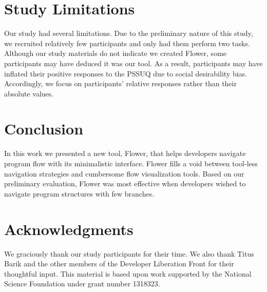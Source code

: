 \documentclass[conference]{IEEEtran}
\begin{document}
	




\section{Study Limitations}
Our study had several limitations.
Due to the preliminary nature of this study, we recruited relatively few participants and only had them perform two tasks.
Although our study materials do not indicate we created Flower, some participants may have deduced it was our tool.
As a result, participants may have inflated their positive responses to the PSSUQ due to social desirability bias.
Accordingly, we focus on participants' relative responses rather than their absolute values.

\section{Conclusion}

In this work we presented a new tool, Flower, that helps developers navigate program flow with its minimalistic interface. 
Flower  fills a void between tool-less navigation strategies and cumbersome flow visualization tools.
Based on our preliminary evaluation, Flower  was most effective when developers wished to navigate program structures with few branches.

\section{Acknowledgments}
We graciously thank our study participants for their time. 
We also thank Titus Barik and the other members of the Developer Liberation Front for their thoughtful input. 
This material is based upon work supported by the National Science Foundation under grant number 1318323.
\end{document}
